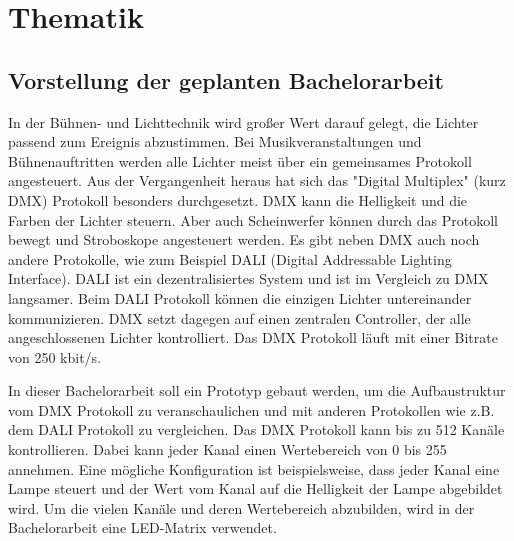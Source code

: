 
\chapter{Thematik} %

\label{ChapterThematik} %



\section{Vorstellung der geplanten Bachelorarbeit}

In der Bühnen- und Lichttechnik wird großer Wert darauf gelegt, die Lichter passend zum Ereignis abzustimmen. Bei Musikveranstaltungen und Bühnenauftritten werden alle Lichter meist über ein gemeinsames Protokoll angesteuert. Aus der Vergangenheit heraus hat sich das "Digital Multiplex" (kurz DMX) Protokoll besonders durchgesetzt. DMX kann die Helligkeit und die Farben der Lichter steuern. Aber auch Scheinwerfer können durch das Protokoll bewegt und Stroboskope angesteuert werden. Es gibt neben DMX auch noch andere Protokolle, wie zum Beispiel DALI (Digital Addressable Lighting Interface). DALI ist ein dezentralisiertes System und ist im Vergleich zu DMX langsamer. Beim DALI Protokoll können die einzigen Lichter untereinander kommunizieren.  DMX setzt dagegen auf einen zentralen Controller, der alle angeschlossenen Lichter kontrolliert. Das DMX Protokoll läuft mit einer Bitrate von 250 kbit/s.

In dieser Bachelorarbeit soll ein Prototyp gebaut werden, um die Aufbaustruktur vom DMX Protokoll zu veranschaulichen und mit anderen Protokollen wie z.B. dem DALI Protokoll zu vergleichen. Das DMX Protokoll kann bis zu 512 Kanäle kontrollieren. Dabei kann jeder Kanal einen Wertebereich von 0 bis 255 annehmen. Eine mögliche Konfiguration ist beispielsweise, dass jeder Kanal eine Lampe steuert und der Wert vom Kanal auf die Helligkeit der Lampe abgebildet wird. Um die vielen Kanäle und deren Wertebereich abzubilden, wird in der Bachelorarbeit eine LED-Matrix verwendet.

